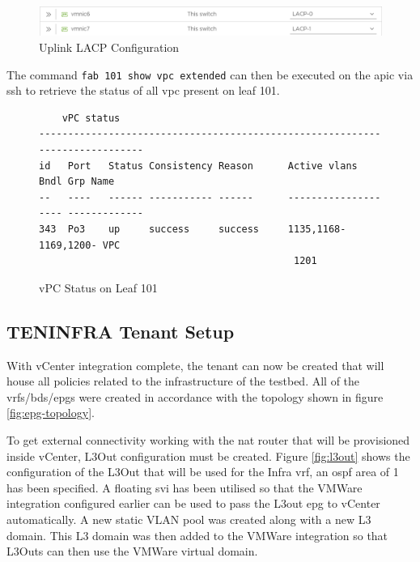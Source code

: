 \begin{figure}[H]
    
    \centering
    \includegraphics[scale=0.7]{images/lacp-interface-assignment.png}
    
    \caption{Uplink LACP Configuration}
    \label{fig:uplink-lacp}
\end{figure}
The command \verb|fab 101 show vpc extended| can then be executed on the \gls{apic} via \gls{ssh} to retrieve the status of all \gls{vpc} present on leaf 101.
\begin{figure}[H]
    \begin{small}
        \begin{verbatim}
    vPC status
-----------------------------------------------------------------------------
id   Port   Status Consistency Reason      Active vlans         Bndl Grp Name
--   ----   ------ ----------- ------      -------------------- -------------
343  Po3    up     success     success     1135,1168-1169,1200- VPC
                                            1201

    \end{verbatim}
    \end{small}
    \caption{vPC Status on Leaf 101}
    \label{fig:vpc-status}
\end{figure}


\subsection{TEN\textunderscore INFRA Tenant Setup}
With vCenter integration complete, the tenant can now be created that will house all policies related to the infrastructure of the testbed. All of the \gls{vrf}s/\gls{bd}s/\gls{epg}s were created in accordance with the topology shown in figure \ref{fig:epg-topology}.

To get external connectivity working with the \gls{nat} router that will be provisioned inside vCenter, L3Out configuration must be created. Figure \ref{fig:l3out} shows the configuration of the L3Out that will be used for the Infra \gls{vrf}, an \gls{ospf} area of 1 has been specified. A floating \gls{svi} has been utilised so that the VMWare integration configured earlier can be used to pass the L3out \gls{epg} to vCenter automatically. A new static VLAN pool was created along with a new L3 domain. This L3 domain was then added to the VMWare integration so that L3Outs can then use the VMWare virtual domain.

